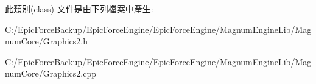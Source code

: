 此類別(class) 文件是由下列檔案中產生\+:\begin{DoxyCompactItemize}
\item 
C\+:/\+Epic\+Force\+Backup/\+Epic\+Force\+Engine/\+Epic\+Force\+Engine/\+Magnum\+Engine\+Lib/\+Magnum\+Core/Graphics2.\+h\item 
C\+:/\+Epic\+Force\+Backup/\+Epic\+Force\+Engine/\+Epic\+Force\+Engine/\+Magnum\+Engine\+Lib/\+Magnum\+Core/Graphics2.\+cpp\end{DoxyCompactItemize}
